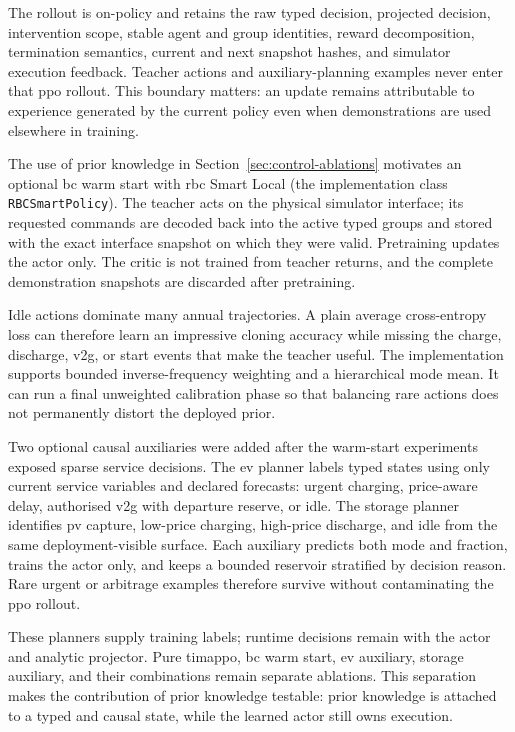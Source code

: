 The rollout is on-policy and retains the raw typed decision, projected decision, intervention scope, stable agent and group identities, reward decomposition, termination semantics, current and next snapshot hashes, and simulator execution feedback. Teacher actions and auxiliary-planning examples never enter that \gls{ppo} rollout. This boundary matters: an update remains attributable to experience generated by the current policy even when demonstrations are used elsewhere in training.

\label{sec:timarl-prior-knowledge}

The use of prior knowledge in Section~\ref{sec:control-ablations} motivates an optional \gls{bc} warm start with \gls{rbc} Smart Local (the implementation class \texttt{RBCSmartPolicy}). The teacher acts on the physical simulator interface; its requested commands are decoded back into the active typed groups and stored with the exact interface snapshot on which they were valid. Pretraining updates the actor only. The critic is not trained from teacher returns, and the complete demonstration snapshots are discarded after pretraining.

Idle actions dominate many annual trajectories. A plain average cross-entropy loss can therefore learn an impressive cloning accuracy while missing the charge, discharge, \gls{v2g}, or start events that make the teacher useful. The implementation supports bounded inverse-frequency weighting and a hierarchical mode mean. It can run a final unweighted calibration phase so that balancing rare actions does not permanently distort the deployed prior.

Two optional causal auxiliaries were added after the warm-start experiments exposed sparse service decisions. The \gls{ev} planner labels typed states using only current service variables and declared forecasts: urgent charging, price-aware delay, authorised \gls{v2g} with departure reserve, or idle. The storage planner identifies \gls{pv} capture, low-price charging, high-price discharge, and idle from the same deployment-visible surface. Each auxiliary predicts both mode and fraction, trains the actor only, and keeps a bounded reservoir stratified by decision reason. Rare urgent or arbitrage examples therefore survive without contaminating the \gls{ppo} rollout.

These planners supply training labels; runtime decisions remain with the actor and analytic projector. Pure \gls{timappo}, \gls{bc} warm start, \gls{ev} auxiliary, storage auxiliary, and their combinations remain separate ablations. This separation makes the contribution of prior knowledge testable: prior knowledge is attached to a typed and causal state, while the learned actor still owns execution.


